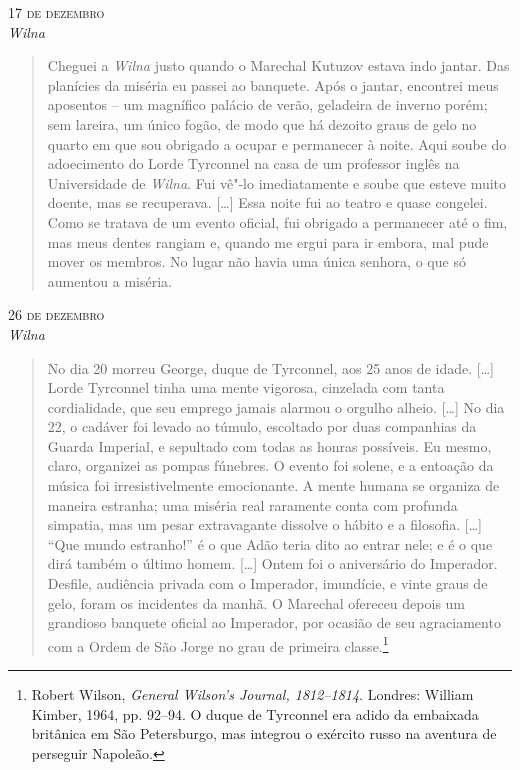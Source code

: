 \begin{flushright}
\smallskip\hfill\textsc{17 de dezembro}\\
\textit{Wilna}
\end{flushright}
\begin{quote}
Cheguei a \textit{Wilna} justo quando o Marechal Kutuzov estava indo
jantar. Das planícies da miséria eu passei ao banquete. Após o jantar,
encontrei meus aposentos -- um magnífico palácio de verão, geladeira de
inverno porém; sem lareira, um único fogão, de modo que há dezoito graus
de gelo no quarto em que sou obrigado a ocupar e permanecer à noite.
Aqui soube do adoecimento do Lorde Tyrconnel na casa de um professor
inglês na Universidade de \textit{Wilna}. Fui vê"-lo imediatamente e soube que
esteve muito doente, mas se recuperava. [\ldots{}] Essa noite fui ao
teatro e quase congelei. Como se tratava de um evento oficial, fui
obrigado a permanecer até o fim, mas meus dentes rangiam e, quando me
ergui para ir embora, mal pude mover os membros. No lugar não havia uma
única senhora, o que só aumentou a miséria.
\end{quote}

\begin{flushright}
\smallskip\hfill\textsc{26 de dezembro}\\
\textit{Wilna}
\end{flushright}
\begin{quote}
No dia 20 morreu George, duque de Tyrconnel, aos 25 anos de
idade. [\ldots{}] Lorde Tyrconnel tinha uma mente vigorosa, cinzelada com
tanta cordialidade, que seu emprego jamais alarmou o orgulho alheio.
[\ldots{}] No dia 22, o cadáver foi levado ao túmulo, escoltado por duas
companhias da Guarda Imperial, e sepultado com todas as honras
possíveis. Eu mesmo, claro, organizei as pompas fúnebres. O evento foi
solene, e a entoação da música foi irresistivelmente emocionante. A
mente humana se organiza de maneira estranha; uma miséria real raramente
conta com profunda simpatia, mas um pesar extravagante dissolve o hábito
e a filosofia. [\ldots{}] ``Que mundo estranho!'' é o que Adão teria dito
ao entrar nele; e é o que dirá também o último homem. [\ldots{}] Ontem foi
o aniversário do Imperador. Desfile, audiência privada com o Imperador,
imundície, e vinte graus de gelo, foram os incidentes da manhã. O
Marechal ofereceu depois um grandioso banquete oficial ao Imperador, por
ocasião de seu agraciamento com a Ordem de São Jorge no grau de primeira
classe.\footnote{Robert Wilson, \textit{General Wilson's Journal, 1812--1814}. Londres: William Kimber, 1964, pp. 92--94. O duque de Tyrconnel era adido da embaixada britânica em São Petersburgo, mas integrou o exército russo na aventura de perseguir Napoleão.} 
\end{quote}

